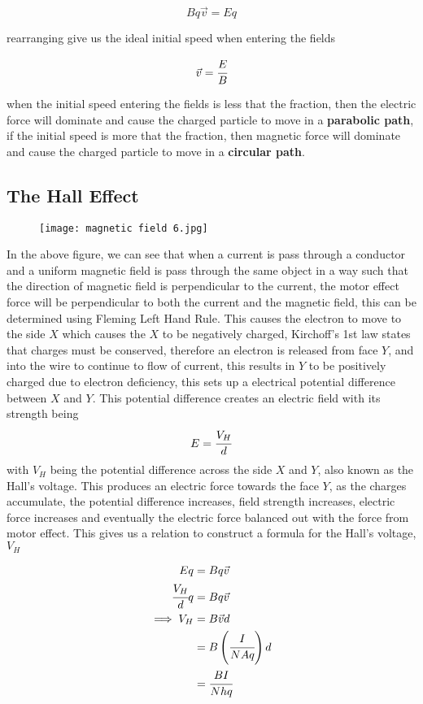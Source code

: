 \documentclass{article}
\begin{document}
$$Bq\vec{v}=Eq$$

rearranging give us the ideal initial speed when entering the fields

$$\vec{v}=\cfrac{E}{B}$$

when the initial speed entering the fields is less that the fraction, then the electric force will dominate and cause the charged particle to move in a \textbf{parabolic path}, if the initial speed is more that the fraction, then magnetic force will dominate and cause the charged particle to move in a \textbf{circular path}.


 \subsection{The Hall Effect}


\begin{figure}[H]
    \centering
    \texttt{[image: magnetic field 6.jpg]}
\end{figure}

In the above figure, we can see that when a current is pass through a conductor and a uniform magnetic field is pass through the same object in a way such that the direction of magnetic field is perpendicular to the current, the motor effect force will be perpendicular to both the current and the magnetic field, this can be determined using Fleming Left Hand Rule. This causes the electron to move to the side $X$ which causes the $X$ to be negatively charged, Kirchoff's 1st law states that charges must be conserved,  therefore an electron is released from face $Y$, and into the wire to continue to flow of current, this results in $Y$ to be positively charged due to electron deficiency, this sets up a electrical potential difference between $X$ and $Y$. This potential difference creates an electric field with its strength being 
$$E=\cfrac{V_H}{d}$$
with $V_H$ being the potential difference across the side $X$ and $Y$, also known as the Hall's voltage. This produces an electric force towards the face $Y$, as the charges accumulate, the potential difference increases, field strength increases, electric force increases and eventually the electric force balanced out with the force from motor effect. This gives us a relation to construct a formula for the Hall's voltage, $V_H$

\begin{align*}
    Eq&=Bq\vec{v} \\ \cfrac{V_H}{d}q&=Bq\vec{v} \\ \implies V_H&=B\vec{v}d \\ &=B\left(\cfrac{I}{NAq}\right)d \\ &= \cfrac{BI}{Nhq}
\end{align*}
\end{document}
